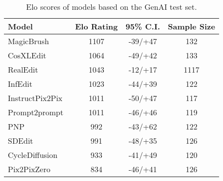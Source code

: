 \begin{table}[ht]
    \centering
    \caption{Elo scores of models based on the GenAI\cite{jiang2024genai} test set.}
    \begin{tabular}{lccc}
        \toprule
        Model & Elo Rating & 95\% C.I. & Sample Size \\
        \midrule
        MagicBrush~\cite{zhang2024magicbrush}      & 1107 & -39/+47  & 132 \\
        CosXLEdit~\cite{stabilityai2024cosxl}       & 1064 & -49/+42  & 133 \\
        RealEdit        & 1043 & -12/+17  & 1117 \\
        InfEdit~\cite{xu2023infedit}         & 1023 & -44/+39  & 122 \\
        InstructPix2Pix~\cite{brooks2023instructpix2pix} & 1011 & -50/+47  & 117 \\
        Prompt2prompt~\cite{hertz2022prompt}   & 1011 & -46/+46  & 119 \\
        PNP~\cite{tumanyan2023plug}             & 992  & -43/+62  & 122 \\
        SDEdit~\cite{meng2021sdedit}          & 991  & -48/+35  & 126 \\
        CycleDiffusion~\cite{wu2023latent}  & 933  & -41/+49  & 120 \\
        Pix2PixZero~\cite{parmar2023zero}     & 834  & -46/+41  & 126 \\
        \bottomrule
    \end{tabular}
    \label{tab:elo_genai}
\end{table}
